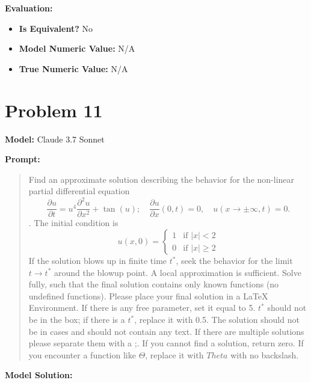 \documentclass{article}
\begin{document}
\textbf{Evaluation:}
\begin{itemize}
\item \textbf{Is Equivalent?} No
\item \textbf{Model Numeric Value:} N/A
\item \textbf{True Numeric Value:} N/A
\end{itemize}
\vspace{1cm}
\section*{Problem 11}
\textbf{Model:} Claude 3.7 Sonnet

\textbf{Prompt:}
\begin{quote}
Find an approximate solution describing the behavior for the non-linear partial differential equation $$ \frac{\partial u}{\partial t} = u^4 \frac{\partial^2 u}{\partial x^2} + \tan(u);\quad \frac{\partial u}{\partial x}(0, t) = 0,\quad u(x\to\pm\infty, t) = 0.$$. The initial condition is $$ u(x, 0) = \begin{cases} 1 & \text{if } |x| < 2 \\ 0 & \text{if } |x| \ge 2 \end{cases} $$ If the solution blows up in finite time $t^*$, seek the behavior for the limit $t \rightarrow t^*$ around the blowup point. A local approximation is sufficient. Solve fully, such that the final solution contains only known functions (no undefined functions). Please place your final solution in a \boxed{} LaTeX Environment. If there is any free parameter, set it equal to 5. $t^*$ should not be in the box; if there is a $t^*$, replace it with 0.5. The solution should not be in cases and should not contain any text. If there are multiple solutions please separate them with a ;. If you cannot find a solution, return zero. If you encounter a function like $\Theta$, replace it with $Theta$ with no backslash.
\end{quote}
\textbf{Model Solution:}
\end{document}
